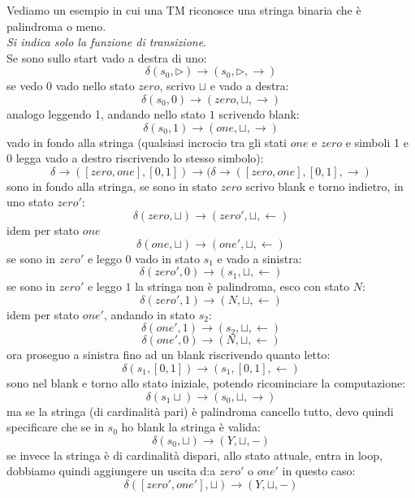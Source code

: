 \documentclass[a4paper,12pt, oneside]{book}
\begin{document}
\begin{esempio}
  Vediamo un esempio in cui una TM riconosce una stringa binaria che è
  palindroma o meno.\\
  \textit{Si indica solo la funzione di transizione}.\\
  Se sono sullo start vado a destra di uno:
  \[\delta(s_0,\triangleright)\to (s_0,\triangleright, \rightarrow)\]
  se vedo 0 vado nello stato $zero$, scrivo $\sqcup$ e vado a destra:
  \[\delta(s_0,0)\to (zero,\sqcup, \rightarrow)\]
  analogo leggendo 1, andando nello stato $1$ scrivendo blank:
  \[\delta(s_0,1)\to (one,\sqcup, \rightarrow)\]
  vado in fondo alla stringa (qualsiasi incrocio tra gli stati $one$ e $zero $ e
  simboli 1 e 0 legga vado a destro riscrivendo lo stesso simbolo):
  \[\delta\to([zero, one],[0,1])\to(\delta\to([zero, one],[0,1],\rightarrow)\]
  sono in fondo alla stringa, se sono in stato $zero$ scrivo blank e torno
  indietro, in uno stato $zero'$:
  \[\delta(zero, \sqcup)\to(zero', \sqcup, \leftarrow)\]
  idem per stato $one$
  \[\delta(one, \sqcup)\to(one', \sqcup, \leftarrow)\]
  se sono in $zero'$ e leggo $0$ vado in stato $s_1$ e vado a sinistra: 
  \[\delta(zero', 0)\to(s_1,\sqcup, \leftarrow)\]
  se sono in $zero'$ e leggo $1$ la stringa non è palindroma, esco con stato
  $N$:
  \[\delta(zero', 1)\to(N,\sqcup, \leftarrow)\]
  idem per stato $one'$, andando in stato $s_2$:
  \[\delta(one', 1)\to(s_2,\sqcup, \leftarrow)\]
  \[\delta(one', 0)\to(N,\sqcup, \leftarrow)\]
  ora proseguo a sinistra fino ad un blank riscrivendo quanto letto:
  \[\delta(s_1,[0,1])\to(s_1,[0,1], \leftarrow)\]
  sono nel blank e torno allo stato iniziale, potendo ricominciare la
  computazione:
  \[\delta(s_1\sqcup)\to(s_0,\sqcup, \rightarrow)\]
  ma se la stringa (di cardinalità pari) è palindroma cancello tutto, devo
  quindi specificare che se in $s_0$ ho blank la stringa è valida:
  \[\delta(s_0,\sqcup)\to(Y, \sqcup,-)\]
  se invece la stringa è di cardinalità dispari, allo stato attuale, entra in
  loop, dobbiamo quindi aggiungere un uscita d:a $zero'$ o $one'$ in questo
  caso:
  \[\delta([zero',one'], \sqcup)\to(Y, \sqcup, -)\]
\end{esempio}
\end{document}
